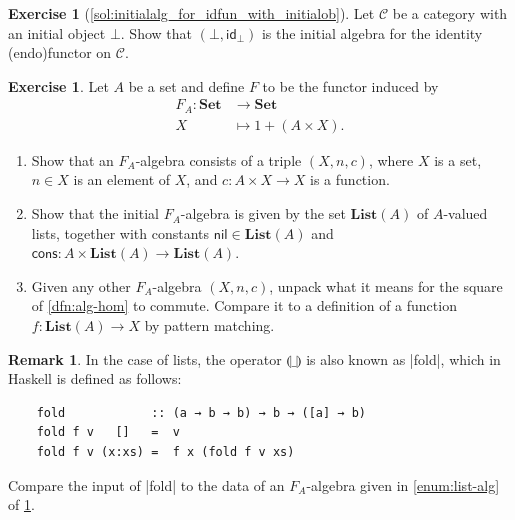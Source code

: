 \documentclass[a4paper,11pt, oneside,titlepage=false]{scrbook}
\theoremstyle{plain}
\theoremstyle{definition}
\newtheorem{rem}[thm]{Remark}
\newtheorem{exer}[thm]{Exercise}
\newcommand{\cfont}[1]{\ensuremath{\mathsf{#1}}}
\newcommand{\Cat}[1]{\mathcal{#1}}
\newcommand{\CC}{\Cat{C}}
\newcommand{\Catb}[1]{\mathbf{#1}}
\newcommand{\List}{\Catb{List}}
\newcommand{\SET}{\Catb{Set}}
\newcommand{\Id}[1][]{\cfont{id}_{#1}}
\newcommand{\catam}[1]{\llparenthesis #1 \rrparenthesis}
\newcommand{\nil}{\ensuremath{\mathsf{nil}}}
\newcommand{\cons}{\ensuremath{\mathsf{cons}}}
\begin{document}
\begin{exer}[\cref{sol:initialalg_for_idfun_with_initialob}]\label{exer:initialalg_for_idfun_with_initialob} Let $\CC$ be a category with an initial object $\bot$. Show that $(\bot, \Id[\bot])$ is the initial algebra for the identity (endo)functor on $\CC$.
\end{exer}

\begin{exer}\label{exer:initialalg_for_list}
  Let $A$ be a set and define $F$ to be the functor induced by
\begin{align*}
  F_A:\SET &\to\SET
\\
  X &\mapsto 1 + (A\times X).
\end{align*}

\begin{enumerate}
\item \label{enum:list-alg} Show that an $F_A$-algebra consists of a triple $(X,n,c)$, where $X$ is a set, $n\in X$ is an element of $X$, and $c : A \times X \to X$ is a function.
\item Show that the initial $F_A$-algebra is given by the set $\List(A)$ of $A$-valued lists, together with constants $\nil \in \List(A)$ and $\cons : A \times \List(A) \to \List(A)$.
\item Given any other $F_A$-algebra $(X,n,c)$, unpack what it means for the square of \cref{dfn:alg-hom} to commute.
Compare it to a definition of a function $f : \List(A) \to X$ by pattern matching.
\end{enumerate}

\end{exer}

\begin{rem}
  In the case of lists, the operator $\catam{\_}$ is also known as |fold|, which in Haskell is defined as follows:
  \begin{lstlisting}
    fold            :: (a → b → b) → b → ([a] → b)
    fold f v   []   =  v
    fold f v (x:xs) =  f x (fold f v xs)
  \end{lstlisting}
  Compare the input of |fold| to the data of an $F_A$-algebra given in \cref{enum:list-alg} of \cref{exer:initialalg_for_list}.
\end{rem}
\end{document}
